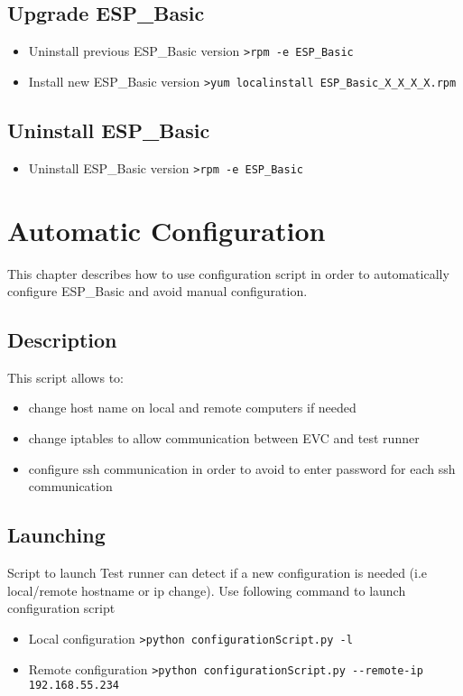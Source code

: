 \section{Upgrade ESP\_Basic}
\begin{itemize}
\item Uninstall previous ESP\_Basic version
	\newline
	\verb|>rpm -e ESP_Basic |
\item Install new ESP\_Basic version
	\newline
	\verb|>yum localinstall ESP_Basic_X_X_X_X.rpm |
\end{itemize}

\section{Uninstall ESP\_Basic}
\begin{itemize}
\item Uninstall ESP\_Basic version
	\newline
	\verb|>rpm -e ESP_Basic |
\end{itemize}

\chapter{Automatic Configuration}
This chapter describes how to use configuration script in order to automatically configure ESP\_Basic and avoid manual configuration.
\section{Description}
This script allows to:
\begin{itemize}
\item change host name on local and remote computers if needed
\item change iptables to allow communication between EVC and test runner
\item configure ssh communication in order to avoid to enter password for each ssh communication
\end{itemize}

\section{Launching}
Script to launch Test runner can detect if a new configuration is needed (i.e local/remote hostname or ip change).
Use following command to launch configuration script
\begin{itemize} 
\item Local configuration
\newline
\verb|>python configurationScript.py -l |
\item Remote configuration
\newline
\verb|>python configurationScript.py --remote-ip 192.168.55.234 |
\end{itemize}

